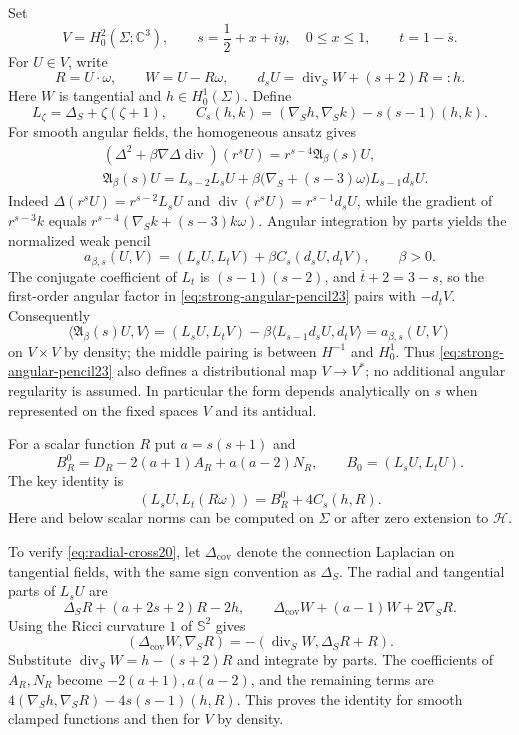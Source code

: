 \documentclass[11pt,a4paper]{article}
\theoremstyle{remark}
\numberwithin{equation}{section}
\begin{document}
Set
\[
 V=H_0^2(\Sigma;\mathbb C^3),\qquad
 s=\frac12+x+iy,\quad 0\le x\le1,\qquad
 t=1-\overline s.
\]
For $U\in V$, write
\[
 R=U\cdot\omega,\qquad W=U-R\omega,\qquad
 d_sU=\operatorname{div}_S W+(s+2)R=:h.
\]
Here $W$ is tangential and $h\in H_0^1(\Sigma)$. Define
\[
 L_\zeta=\Delta_S+\zeta(\zeta+1),\qquad
 C_s(h,k)=(\nabla_Sh,\nabla_Sk)-s(s-1)(h,k).
\]
For smooth angular fields, the homogeneous ansatz gives
\begin{equation}\label{eq:strong-angular-pencil23}
 \begin{split}
 &(\Delta^2+\beta\nabla\Delta\operatorname{div})(r^sU)
       =r^{s-4}\mathfrak A_\beta(s)U,\\
 &\mathfrak A_\beta(s)U
       =L_{s-2}L_sU
        +\beta\bigl(\nabla_S+(s-3)\omega\bigr)L_{s-1}d_sU.
 \end{split}
\end{equation}
Indeed $\Delta(r^sU)=r^{s-2}L_sU$ and
$\operatorname{div}(r^sU)=r^{s-1}d_sU$, while the gradient of
$r^{s-3}k$ equals $r^{s-4}(\nabla_Sk+(s-3)k\omega)$.
Angular integration by parts yields the normalized weak pencil
\begin{equation}\label{eq:weak-pencil20}
 a_{\beta,s}(U,V)=(L_sU,L_tV)+\beta C_s(d_sU,d_tV),\qquad\beta>0.
\end{equation}
The conjugate coefficient of $L_t$ is $(s-1)(s-2)$, and
$\overline t+2=3-s$, so the first-order angular factor in
\eqref{eq:strong-angular-pencil23} pairs with $-d_tV$.
Consequently
\[
 \langle\mathfrak A_\beta(s)U,V\rangle
 =(L_sU,L_tV)-\beta\langle L_{s-1}d_sU,d_tV\rangle
 =a_{\beta,s}(U,V)
\]
on $V\times V$ by density; the middle pairing is between $H^{-1}$ and
$H^1_0$.
Thus \eqref{eq:strong-angular-pencil23} also defines a distributional
map $V\to V^*$; no additional angular regularity is assumed.
In particular the form depends analytically on $s$ when represented on the
fixed spaces $V$ and its antidual.

For a scalar function $R$ put $a=s(s+1)$ and
\[
 B_R^0=D_R-2(a+1)A_R+a(a-2)N_R,
 \qquad B_0=(L_sU,L_tU).
\]
The key identity is
\begin{equation}\label{eq:radial-cross20}
 (L_sU,L_t(R\omega))=B_R^0+4C_s(h,R).
\end{equation}
Here and below scalar norms can be computed on $\Sigma$ or after zero
extension to $\mathcal H$.

To verify \eqref{eq:radial-cross20}, let $\Delta_{\mathrm{cov}}$ denote the
connection Laplacian on tangential fields, with the same sign convention
as $\Delta_S$. The radial and tangential parts of $L_sU$ are
\[
 \Delta_SR+(a+2s+2)R-2h,
 \qquad \Delta_{\mathrm{cov}}W+(a-1)W+2\nabla_SR.
\]
Using the Ricci curvature $1$ of $\mathbb S^2$ gives
\[
 (\Delta_{\mathrm{cov}}W,\nabla_SR)
 =-(\operatorname{div}_S W,\Delta_SR+R).
\]
Substitute $\operatorname{div}_S W=h-(s+2)R$ and integrate by parts.
The coefficients of $A_R,N_R$ become $-2(a+1),a(a-2)$, and the
remaining terms are $4(\nabla_Sh,\nabla_SR)-4s(s-1)(h,R)$.
This proves the identity for smooth clamped functions and then for $V$
by density.
\end{document}
